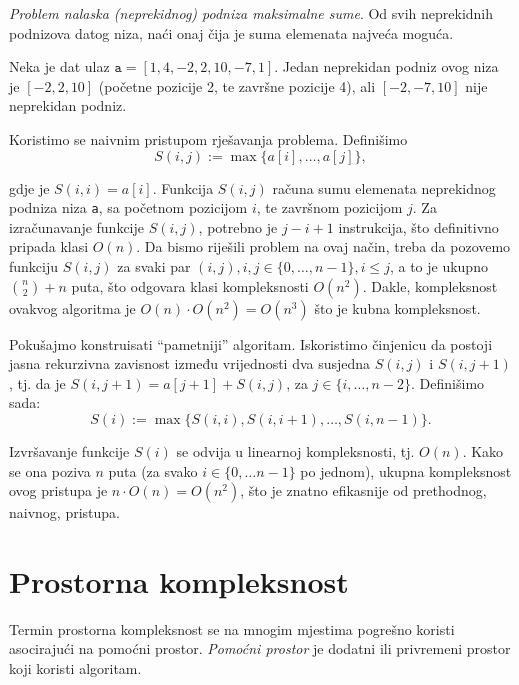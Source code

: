 \begin{example}
 \textit{{Problem nalaska (neprekidnog) podniza  maksimalne sume}}.  Od svih neprekidnih podnizova datog
 niza, naći onaj čija je suma elemenata najveća moguća. 
\end{example}
\begin{solution}
 
 Neka je dat ulaz $\texttt{a} = [1, 4, -2, 2, 10, -7, 1]$.  Jedan neprekidan podniz ovog niza je $[ -2, 2, 10 ]$ (početne pozicije 2, te završne pozicije 4), ali $[-2, -7, 10]$ nije neprekidan podniz. 
 
Koristimo se naivnim pristupom rješavanja problema. Definišimo $$S(i, j) := \max  \{ a[i], \ldots, a[j] \},$$

gdje je $S(i, i ) = a[i]$. 
Funkcija $S(i,j)$ računa sumu elemenata neprekidnog podniza niza \texttt{a}, sa početnom pozicijom  $i$, te završnom pozicijom $j$.
Za izračunavanje funkcije $S(i, j)$, potrebno je $j-i+1$ instrukcija, što definitivno pripada klasi $O(n)$. Da bismo riješili problem na ovaj način, 
treba da pozovemo funkciju $S(i,j)$ za svaki par $(i,j),  {i, j \in \{0, \ldots , n-1\},  i \leq j}$, a to je ukupno $\binom{n}{2} + n$ puta, što odgovara klasi kompleksnosti $O(n^2)$. Dakle, kompleksnost ovakvog algoritma je $O(n)\cdot O(n^2) = O(n^3)$ što je kubna kompleksnost. 

Pokušajmo konstruisati ``pametniji'' algoritam. Iskoristimo činjenicu da postoji jasna rekurzivna zavisnost između vrijednosti dva susjedna $S(i,j)$ i $S(i, j+1)$, tj. da je $S(i, j+1) = a[j+1] + S(i, j)$, za $j \in \{i, \ldots, n-2\}$. Definišimo sada:
$$ S(i):= \max \{ S(i, i), S(i, i+1), \ldots, S(i, n-1)\}.$$

Izvršavanje funkcije $S(i)$ se odvija u linearnoj kompleksnosti, tj. $O(n)$. Kako se ona poziva $n$ puta (za svako $i \in \{0, \ldots n-1\}$ po jednom), ukupna kompleksnost ovog pristupa je $n \cdot O(n) = O(n^2)$, što je znatno efikasnije od prethodnog, naivnog, pristupa. 
 

\end{solution}



 
 
 \section{Prostorna kompleksnost}
 
 
 Termin prostorna kompleksnost se na mnogim mjestima pogrešno koristi asocirajući na pomoćni prostor.  \textit{Pomoćni prostor} je dodatni ili privremeni prostor koji koristi algoritam.
 
